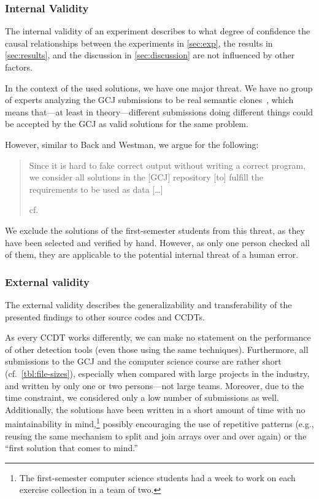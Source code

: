 \documentclass[10pt,journal,compsoc]{IEEEtran}
\def\todo#1{\textcolor{brown!80!yellow!70!black!90!red}{[\textsc{todo}: \textsf{#1}]}}
\begin{document}
\subsubsection{Internal Validity}
The internal validity of an experiment describes to what degree of confidence the
causal relationships between the experiments in \cref{sec:exp}, the results in \cref{sec:results}, and the discussion in \cref{sec:discussion} are not influenced by other factors.

In the context of the used solutions, we have one major threat.
We have no group of experts analyzing the GCJ submissions to be real semantic clones~\cite{svajlenko2014towards}, which means that---at least in theory---different submissions doing different things could be accepted by the GCJ as valid solutions for the same problem.

However, similar to Back and Westman, we argue for the following:
\blockquote[cf.~{\cite[p.~10]{ComparingProgrammingLanguages2017}}]{Since it is hard to fake correct output without writing a correct program, we consider all solutions in the [GCJ] repository [to] fulfill the
requirements to be used as data [\ldots]}

We exclude the solutions of the first-semester students from this threat, as they have been selected and verified by hand. However, as only one person checked all of them, they are applicable to the potential internal threat of a human error.


\subsubsection{External validity}
The external validity describes the generalizability and transferability
of the presented findings to other source codes and CCDTs.

As every CCDT works differently, we can make no statement on the performance of other detection tools (even those using the same techniques).
Furthermore, all submissions to the GCJ and the computer science course are rather short (cf.~\cref{tbl:file-sizes}), especially when compared with large projects in the industry, and written by only one or two persons---not large teams. Moreover, due to the time constraint, we considered only a low number of submissions as well.
Additionally, the solutions have been written in a short amount of time with no maintainability in mind,\footnote{The first-semester computer science students had a week to work on each exercise collection in a team of two.} possibly encouraging the use of repetitive patterns (e.g., reusing the same mechanism to split and join arrays over and over again) or the \enquote{first solution that comes to mind.}
\end{document}
